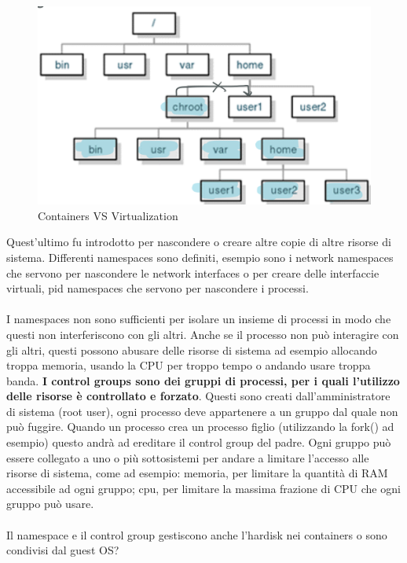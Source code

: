 \documentclass{article}
\begin{document}
\begin{figure}[H]
\centering
\includegraphics[scale=0.5]{img/Virt_tech/22.png}
\caption{Containers VS Virtualization}
\end{figure}
Quest'ultimo fu introdotto per nascondere o creare altre copie di altre risorse di sistema. Differenti namespaces sono definiti, esempio sono i network namespaces che servono per nascondere le network interfaces o per creare delle interfaccie virtuali, pid namespaces che servono per nascondere i processi.
\\ \\
I namespaces non sono sufficienti per isolare un insieme di processi in modo che questi non interferiscono con gli altri. Anche se il processo non può interagire con gli altri, questi possono abusare delle risorse di sistema ad esempio allocando troppa memoria, usando la CPU per troppo tempo o andando usare troppa banda. \textbf{I control groups sono dei gruppi di processi, per i quali l'utilizzo delle risorse è controllato e forzato}. Questi sono creati dall'amministratore di sistema (root user), ogni processo deve appartenere a un gruppo dal quale non può fuggire. Quando un processo crea un processo figlio (utilizzando la fork() ad esempio) questo andrà ad ereditare il control group del padre. Ogni gruppo può essere collegato a uno o più sottosistemi per andare a limitare l'accesso alle risorse di sistema, come ad esempio: memoria, per limitare la quantità di RAM accessibile ad ogni gruppo; cpu, per limitare la massima frazione di CPU che ogni gruppo può usare.
\\ \\
Il namespace e il control group gestiscono anche l'hardisk nei containers o sono condivisi dal guest OS?\\
\end{document}
